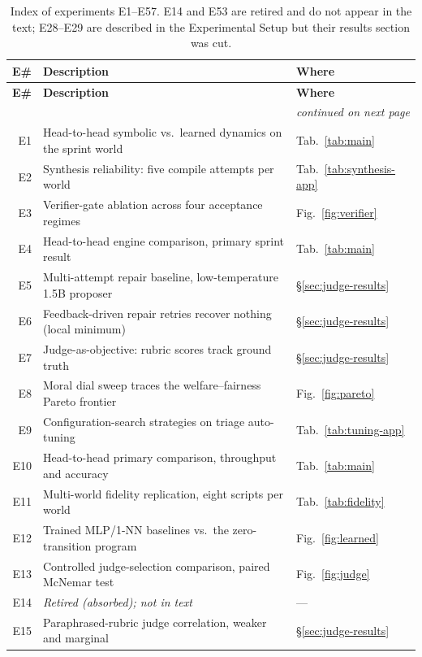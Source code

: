 \documentclass[11pt]{article}
\begin{document}
\begingroup\footnotesize\setlength{\tabcolsep}{4pt}
\begin{longtable}{@{}r p{} l@{}}
\caption{Index of experiments E1--E57. E14 and E53 are retired and do not
appear in the text; E28--E29 are described in the Experimental Setup but their
results section was cut.}\label{tab:experiment-index}\\
\toprule
\textbf{E\#} & \textbf{Description} & \textbf{Where} \\
\midrule
\endfirsthead
\toprule
\textbf{E\#} & \textbf{Description} & \textbf{Where} \\
\midrule
\endhead
\midrule
\multicolumn{3}{r}{\footnotesize\itshape continued on next page}\\
\endfoot
\bottomrule
\endlastfoot
E1 & Head-to-head symbolic vs.\ learned dynamics on the sprint world & Tab.~\ref{tab:main} \\
E2 & Synthesis reliability: five compile attempts per world & Tab.~\ref{tab:synthesis-app} \\
E3 & Verifier-gate ablation across four acceptance regimes & Fig.~\ref{fig:verifier} \\
E4 & Head-to-head engine comparison, primary sprint result & Tab.~\ref{tab:main} \\
E5 & Multi-attempt repair baseline, low-temperature 1.5B proposer & \S\ref{sec:judge-results} \\
E6 & Feedback-driven repair retries recover nothing (local minimum) & \S\ref{sec:judge-results} \\
E7 & Judge-as-objective: rubric scores track ground truth & \S\ref{sec:judge-results} \\
E8 & Moral dial sweep traces the welfare--fairness Pareto frontier & Fig.~\ref{fig:pareto} \\
E9 & Configuration-search strategies on triage auto-tuning & Tab.~\ref{tab:tuning-app} \\
E10 & Head-to-head primary comparison, throughput and accuracy & Tab.~\ref{tab:main} \\
E11 & Multi-world fidelity replication, eight scripts per world & Tab.~\ref{tab:fidelity} \\
E12 & Trained MLP/1-NN baselines vs.\ the zero-transition program & Fig.~\ref{fig:learned} \\
E13 & Controlled judge-selection comparison, paired McNemar test & Fig.~\ref{fig:judge} \\
E14 & \emph{Retired (absorbed); not in text} & --- \\
E15 & Paraphrased-rubric judge correlation, weaker and marginal & \S\ref{sec:judge-results} \\

\end{longtable}
\end{document}
